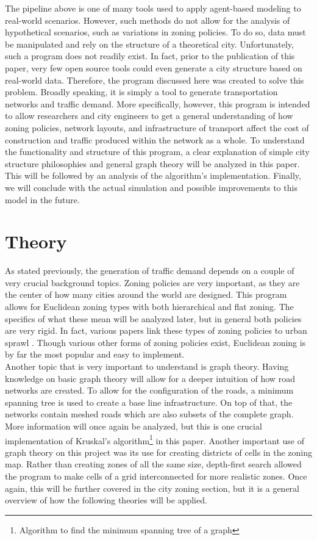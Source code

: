 \documentclass[11pt]{article}
\begin{document}
\begin{multicols}{2}
    \quad The pipeline above is one of many tools used to apply agent-based modeling to real-world scenarios. However, such methods do not allow for the analysis of hypothetical scenarios, such as variations in zoning policies. To do so, data must be manipulated and rely on the structure of a theoretical city. Unfortunately, such a program does not readily exist. In fact, prior to the publication of this paper, very few open source tools could even generate a city structure based on real-world data. Therefore, the program discussed here was created to solve this problem. Broadly speaking, it is simply a tool to generate transportation networks and traffic demand. More specifically, however, this program is intended to allow researchers and city engineers to get a general understanding of how zoning policies, network layouts, and infrastructure of transport affect the cost of construction and traffic produced within the network as a whole. To understand the functionality and structure of this program, a clear explanation of simple city structure philosophies and general graph theory will be analyzed in this paper. This will be followed by an analysis of the algorithm's implementation. Finally, we will conclude with the actual simulation and possible improvements to this model in the future.

    \section{Theory}
    \quad As stated previously, the generation of traffic demand depends on a couple of very crucial background topics. Zoning policies are very important, as they are the center of how many cities around the world are designed. This program allows for Euclidean zoning types with both hierarchical and flat zoning. The specifics of what these mean will be analyzed later, but in general both policies are very rigid. In fact, various papers link these types of zoning policies to urban sprawl \cite{zoning}. Though various other forms of zoning policies exist, Euclidean zoning is by far the most popular and easy to implement.\\
    
    \quad Another topic that is very important to understand is graph theory. Having knowledge on basic graph theory will allow for a deeper intuition of how road networks are created. To allow for the configuration of the roads, a minimum spanning tree is used to create a base line infrastructure. On top of that, the networks contain meshed roads which are also subsets of the complete graph. More information will once again be analyzed, but this is one crucial implementation of Kruskal's algorithm\footnote{Algorithm to find the minimum spanning tree of a graph} in this paper. Another important use of graph theory on this project was its use for creating districts of cells in the zoning map. Rather than creating zones of all the same size, depth-first search allowed the program to make cells of a grid interconnected for more realistic zones. Once again, this will be further covered in the city zoning section, but it is a general overview of how the following theories will be applied.


\end{multicols}
\end{document}
